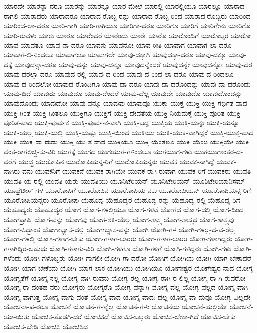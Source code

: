 {ಯಾರದೇ
ಯಾರನ್ನಾ-ದರೂ
ಯಾರನ್ನು
ಯಾರನ್ನೂ
ಯಾರ-ಮೇಲೆ
ಯಾರಲ್ಲಿ
ಯಾರಲ್ಲಿಯೂ
ಯಾರಲ್ಲೂ
ಯಾರಾದ-ರಾಗಲಿ
ಯಾರಾದರು
ಯಾರಾದರೂ
ಯಾರಾದ-ರೊಬ್ಬ-ರನ್ನು
ಯಾರಾದ-ರೊಬ್ಬ-ರಿಂದ
ಯಾರಾದ-ರೊಬ್ಬರು
ಯಾರಿಂದ
ಯಾರಿಂದ-ಲಾ-ದರೂ
ಯಾರಿ-ಗಾಗಿ
ಯಾರಿ-ಗಾಗಿಯೂ
ಯಾರಿಗಾ-ದರೂ
ಯಾರಿಗೂ
ಯಾರಿಗೆ
ಯಾರಿಗೇನು
ಯಾರಿಗೊ
ಯಾರಿ-ರುವಳು
ಯಾರು
ಯಾರೂ
ಯಾರೆಂದರೆ
ಯಾರೆಂದು
ಯಾರೇ
ಯಾರೊ
ಯಾರೊಂದಿಗೆ
ಯಾರೊಬ್ಬರ
ಯಾರೋ
ಯಾವ
ಯಾವತ್ತೂ
ಯಾವ-ನಾ-ದರೂ
ಯಾವನು
ಯಾವನೋ
ಯಾವ-ರೀತಿ
ಯಾವಾಗ
ಯಾವಾಗ-ಲಾ-ದರೂ
ಯಾವಾಗ-ಲಿ-ನಿಂದಲೂ
ಯಾವಾಗಲೂ
ಯಾವಾಗಲೇ
ಯಾವು-ದಕ್ಕಾಗಿ
ಯಾವುದಕ್ಕಾ-ದರೂ
ಯಾವು-ದಕ್ಕೂ
ಯಾವು-ದಕ್ಕೆ
ಯಾವುದನ್ನಾ-ದರೂ
ಯಾವು-ದನ್ನು
ಯಾವು-ದನ್ನೂ
ಯಾವುದನ್ನೆಂದರೆ
ಯಾವುದನ್ನೇ
ಯಾವುದನ್ನೋ
ಯಾವು-ದರ
ಯಾವು-ದರಲ್ಲಾ-ದರೂ
ಯಾವುದ-ರಲ್ಲಿ
ಯಾವು-ದ-ರಿಂದ
ಯಾವು-ದ-ರಿಂದ-ಲಾ-ದರೂ
ಯಾವು-ದ-ರಿಂದಲೂ
ಯಾವು-ದ-ರಿಂದಲೋ
ಯಾವುದ-ರೊಂದಿಗೂ
ಯಾವು-ದಾ-ದರೂ
ಯಾವು-ದಾ-ದರೊಂದನ್ನು
ಯಾವು-ದಾ-ದರೊಂದು
ಯಾವು-ದಿದೆ
ಯಾವುದು
ಯಾವುದೂ
ಯಾವು-ದೆಂದರೆ
ಯಾವು-ದೆಲ್ಲ
ಯಾವುದೇ
ಯಾವುದೊ
ಯಾವುದೊಂದನ್ನು
ಯಾವುದೊಂದು
ಯಾವುದೋ
ಯಾವು-ವನ್ನೂ
ಯಾವುವು
ಯಾವುವೂ
ಯುಕ್ತಾ-ಯುಕ್ತ
ಯುಕ್ತಿ
ಯುಕ್ತಿ-ಗರ್ಭಿತ-ವಾದ
ಯುಕ್ತಿ-ಗಿಂತ
ಯುಕ್ತಿ-ಗಿಂತಲೂ
ಯುಕ್ತಿಗೂ
ಯುಕ್ತಿಗೆ
ಯುಕ್ತಿ-ದೇವತೆಯ
ಯುಕ್ತಿ-ನಿಯಮಕ್ಕೆ
ಯುಕ್ತಿ-ಪೂರಿತ
ಯುಕ್ತಿ-ಪೂರಿತ-ವಾದ
ಯುಕ್ತಿ-ಪೂರ್ವಕ
ಯುಕ್ತಿ-ಪೂರ್ವ-ಕ-ವಾಗಿ
ಯುಕ್ತಿ-ಬದ್ದ
ಯುಕ್ತಿಯ
ಯುಕ್ತಿ-ಯನ್ನು
ಯುಕ್ತಿ-ಯನ್ನೂ
ಯುಕ್ತಿ-ಯಲ್ಲ
ಯುಕ್ತಿ-ಯಲ್ಲಿ
ಯುಕ್ತಿ-ಯಷ್ಟು
ಯುಕ್ತಿ-ಯಿಂದ
ಯುಕ್ತಿಯು
ಯುಕ್ತಿ-ಯುಕ್ತ-ವಾಗಿದ್ದರೆ
ಯುಕ್ತಿ-ಯುಕ್ತ-ವಾದ
ಯುಕ್ತಿ-ಯುಕ್ತ-ವಾ-ದುದು
ಯುಕ್ತಿ-ಯು-ತ-ವಾದ
ಯುಕ್ತಿಯೂ
ಯುಕ್ತಿ-ಯೆಂತಲೂ
ಯುಕ್ತಿ-ಯೆಂಬ
ಯುಕ್ತಿಯೇ
ಯುಕ್ತಿ-ವಂತ-ರಾಗಲಿಚ್ಚಿ-ಸು-ವಿರಿ
ಯುಗಕ್ಕೆ
ಯುಗದ
ಯುಗಯುಗ-ಗಳಿಂದಲೂ
ಯುಗಯುಗ-ಗಳು
ಯುಗಯುಗಾಂತರ-ದ-ವರೆಗೆ
ಯುದ್ಧ
ಯುರೋಪಿನ
ಯುರೋಪಿಯನ್ನ-ರಿಗೆ
ಯುರೋಪಿಯನ್ನರು
ಯುವಕ
ಯುವಕ-ನಾಗಿದ್ದೆ
ಯುವಕ-ನಾಗಿರು-ವನು
ಯುವಕನಿಗೆ
ಯುವಕನೆ
ಯುವಕ-ರಾಗಿಯೇ
ಯುವಕ-ರಾಗಿ-ರುವಾಗ
ಯುವಕ-ರಿಗೆ
ಯುವಕರು
ಯುವತಿ
ಯುವತಿ-ಯ-ರಲ್ಲಿ
ಯುವತಿ-ಯರು
ಯುವತಿಯು
ಯೂನಿಟೆರಿಯನ್
ಯೂನಿಟೇರಿಯನ್
ಯೂನಿಟೇರಿಯಾನಿಸಮ್
ಯೂಫ್ರೆಟೀಸ್-ಗಳ
ಯೂರೋಪಿಗೆ
ಯೂರೋಪಿನ
ಯೂರೋಪಿಯ-ನರು
ಯೂರೋಪಿಯನ್
ಯೂರೋಪಿಯನ್ನ-ರಿಗೆ
ಯೂರೋಪಿಯನ್ನರು
ಯೂರೋಪು
ಯೆಹೂದ್ಯ
ಯೆಹೂದ್ಯರ
ಯೆಹೂದ್ಯ-ರನ್ನು
ಯೆಹೂದ್ಯ-ರಲ್ಲಿ
ಯೆಹೂದ್ಯ-ರಿಗೆ
ಯೆಹೂದ್ಯರು
ಯೊಹೂದ್ಯರ
ಯೋಗ
ಯೋಗ-ಗಳಲ್ಲಿಯೂ
ಯೋಗ-ಗಳಿವೆ
ಯೋಗದ
ಯೋಗ-ದಲ್ಲಿ
ಯೋಗ-ದಿಂದ
ಯೋಗಪ್ರಾಪ್ತಿ
ಯೋಗ-ವನ್ನು
ಯೋಗವು
ಯೋಗ-ಶಕ್ತಿ-ಯೆಲ್ಲ
ಯೋಗ-ಶಾಸ್ತ್ರ
ಯೋಗ-ಶಾಸ್ತ್ರದ
ಯೋಗ-ಶಾಸ್ತ್ರವು
ಯೋಗ-ಸಿದ್ದಾಂತ
ಯೋಗಾಭ್ಯಾಸ-ದಲ್ಲಿ
ಯೋಗಾಭ್ಯಾಸ-ವನ್ನು
ಯೋಗಿ
ಯೋಗಿ-ಗಳ
ಯೋಗಿ-ಗಳಲ್ಲ-ದ-ವ-ರೆಲ್ಲ
ಯೋಗಿ-ಗಳಲ್ಲಿ
ಯೋಗಿ-ಗಳಾಗ-ಬೇಕು
ಯೋಗಿ-ಗಳಾಗ-ಲಾರರು
ಯೋಗಿ-ಗಳಾಗ-ಲಾರಿರಿ
ಯೋಗಿ-ಗಳಾಗಿದ್ದರು
ಯೋಗಿ-ಗಳಾಗಿದ್ದಿರ-ಬಹುದು
ಯೋಗಿ-ಗಳಾಗು-ವಿರಿ
ಯೋಗಿ-ಗಳಿಗೂ
ಯೋಗಿ-ಗಳಿಗೆ
ಯೋಗಿ-ಗಳಿದ್ದರು
ಯೋಗಿ-ಗಳು
ಯೋಗಿ-ಗಳೆಂದು
ಯೋಗಿ-ಗಳೊಬ್ಬರು
ಯೋಗಿ-ಗಾಗಲೀ
ಯೋಗಿ-ಗಾ-ದರೋ
ಯೋಗಿಗೆ
ಯೋಗಿಯ
ಯೋಗಿ-ಯಾಗ-ಬೇಕಾದರೆ
ಯೋಗಿ-ಯಾಗ-ಬೇಕೆಂದು
ಯೋಗಿ-ಯಾಗ-ಲಾರ
ಯೋಗಿಯು
ಯೋಗಿಯೂ
ಯೋಗೇಶ್ವರ
ಯೋಗೇಶ್ವರ-ನಾದ
ಯೋಗ್ಯ
ಯೋಗ್ಯತೆಗೆ
ಯೋಗ್ಯ-ನಲ್ಲ
ಯೋಗ್ಯ-ನಾಗಿ-ರುವನು
ಯೋಗ್ಯ-ರಲ್ಲ
ಯೋಗ್ಯ-ರಾಗಿ-ರ-ಲಿಲ್ಲ
ಯೋಗ್ಯ-ರಾ-ಗಿ-ರುವರೋ
ಯೋಗ್ಯ-ರಾ-ದಂತಹ-ವರು
ಯೋಗ್ಯರು
ಯೋಗ್ಯರೊ
ಯೋಗ್ಯ-ವನ್ನಾಗಿ
ಯೋಗ್ಯ-ವಲ್ಲ
ಯೋಗ್ಯ-ವಲ್ಲದ
ಯೋಗ್ಯ-ವಾಗಿ
ಯೋಗ್ಯ-ವಾಗುತ್ತ
ಯೋಗ್ಯ-ವಾಗು-ವಂತೆ
ಯೋಗ್ಯ-ವಾದ
ಯೋಗ್ಯ-ವಾದು-ದಲ್ಲ
ಯೋಗ್ಯ-ವಾ-ದುವೂ
ಯೋಗ್ಯ-ವಿಲ್ಲದೇ
ಯೋಚನಾ-ಪ-ರರೂ
ಯೋಚನೆ
ಯೋಚನೆ-ಗಳನ್ನೆಲ್ಲ
ಯೋಚನೆ-ಗಳು
ಯೋಚನೆಯ
ಯೋಚನೆ-ಯಲ್ಲಿಯೇ
ಯೋಚನೆ-ಯಾ-ಯಿತು
ಯೋಚಿಸ-ತೊಡಗಿ-ದರೆ
ಯೋಚಿಸದೆ
ಯೋಚಿಸ-ಬಲ್ಲರು
ಯೋಚಿಸ-ಬೇಕಾ-ಗಿದೆ
ಯೋಚಿಸ-ಬೇಕು
ಯೋಚಿಸ-ಬೇಡಿ
ಯೋಚಿಸಿ
ಯೋಚಿಸಿದ
}
